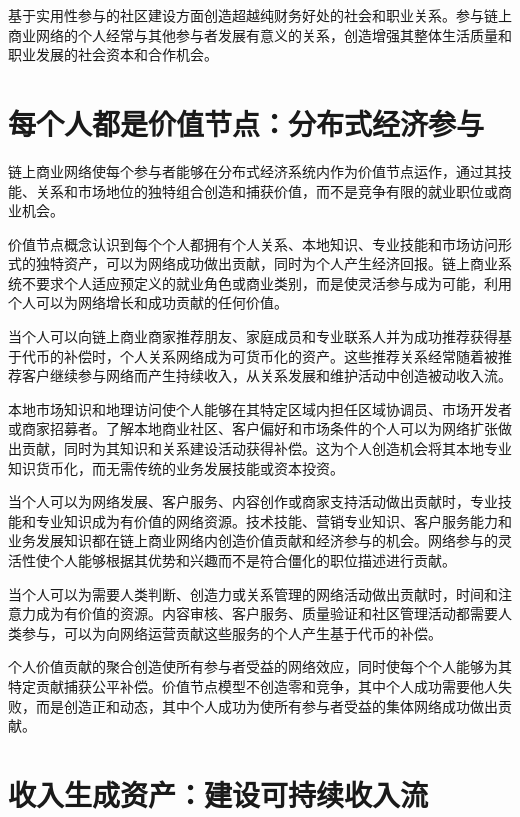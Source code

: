 \documentclass[
  Letterpaper,
]{scrbook}
\begin{document}
基于实用性参与的社区建设方面创造超越纯财务好处的社会和职业关系。参与链上商业网络的个人经常与其他参与者发展有意义的关系，创造增强其整体生活质量和职业发展的社会资本和合作机会。

\section{每个人都是价值节点：分布式经济参与}\label{ux6bcfux4e2aux4ebaux90fdux662fux4ef7ux503cux8282ux70b9ux5206ux5e03ux5f0fux7ecfux6d4eux53c2ux4e0e}

链上商业网络使每个参与者能够在分布式经济系统内作为价值节点运作，通过其技能、关系和市场地位的独特组合创造和捕获价值，而不是竞争有限的就业职位或商业机会。

价值节点概念认识到每个个人都拥有个人关系、本地知识、专业技能和市场访问形式的独特资产，可以为网络成功做出贡献，同时为个人产生经济回报。链上商业系统不要求个人适应预定义的就业角色或商业类别，而是使灵活参与成为可能，利用个人可以为网络增长和成功贡献的任何价值。

当个人可以向链上商业商家推荐朋友、家庭成员和专业联系人并为成功推荐获得基于代币的补偿时，个人关系网络成为可货币化的资产。这些推荐关系经常随着被推荐客户继续参与网络而产生持续收入，从关系发展和维护活动中创造被动收入流。

本地市场知识和地理访问使个人能够在其特定区域内担任区域协调员、市场开发者或商家招募者。了解本地商业社区、客户偏好和市场条件的个人可以为网络扩张做出贡献，同时为其知识和关系建设活动获得补偿。这为个人创造机会将其本地专业知识货币化，而无需传统的业务发展技能或资本投资。

当个人可以为网络发展、客户服务、内容创作或商家支持活动做出贡献时，专业技能和专业知识成为有价值的网络资源。技术技能、营销专业知识、客户服务能力和业务发展知识都在链上商业网络内创造价值贡献和经济参与的机会。网络参与的灵活性使个人能够根据其优势和兴趣而不是符合僵化的职位描述进行贡献。

当个人可以为需要人类判断、创造力或关系管理的网络活动做出贡献时，时间和注意力成为有价值的资源。内容审核、客户服务、质量验证和社区管理活动都需要人类参与，可以为向网络运营贡献这些服务的个人产生基于代币的补偿。

个人价值贡献的聚合创造使所有参与者受益的网络效应，同时使每个个人能够为其特定贡献捕获公平补偿。价值节点模型不创造零和竞争，其中个人成功需要他人失败，而是创造正和动态，其中个人成功为使所有参与者受益的集体网络成功做出贡献。

\section{收入生成资产：建设可持续收入流}\label{ux6536ux5165ux751fux6210ux8d44ux4ea7ux5efaux8bbeux53efux6301ux7eedux6536ux5165ux6d41}
\end{document}
